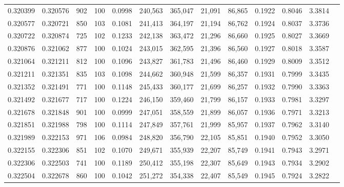 \begin{tabular}{rrrrrrrrrrrrr}
0.320399 & 0.320576 &   902 & 100 &                                     0.0998 & 240,563 & 365,047 &  21,091 &  86,865 & 0.1922 & 0.8046 & 3.3814 \\
0.320577 & 0.320721 &   850 & 103 &                                     0.1081 & 241,413 & 364,197 &  21,194 &  86,762 & 0.1924 & 0.8037 & 3.3736 \\
0.320722 & 0.320874 &   725 & 102 &                                     0.1233 & 242,138 & 363,472 &  21,296 &  86,660 & 0.1925 & 0.8027 & 3.3669 \\
0.320876 & 0.321062 &   877 & 100 &                                     0.1024 & 243,015 & 362,595 &  21,396 &  86,560 & 0.1927 & 0.8018 & 3.3587 \\
0.321064 & 0.321211 &   812 & 100 &                                     0.1096 & 243,827 & 361,783 &  21,496 &  86,460 & 0.1929 & 0.8009 & 3.3512 \\
0.321211 & 0.321351 &   835 & 103 &                                     0.1098 & 244,662 & 360,948 &  21,599 &  86,357 & 0.1931 & 0.7999 & 3.3435 \\
0.321352 & 0.321491 &   771 & 100 &                                     0.1148 & 245,433 & 360,177 &  21,699 &  86,257 & 0.1932 & 0.7990 & 3.3363 \\
0.321492 & 0.321677 &   717 & 100 &                                     0.1224 & 246,150 & 359,460 &  21,799 &  86,157 & 0.1933 & 0.7981 & 3.3297 \\
0.321678 & 0.321848 &   901 & 100 &                                     0.0999 & 247,051 & 358,559 &  21,899 &  86,057 & 0.1936 & 0.7971 & 3.3213 \\
0.321851 & 0.321988 &   798 & 100 &                                     0.1114 & 247,849 & 357,761 &  21,999 &  85,957 & 0.1937 & 0.7962 & 3.3140 \\
0.321989 & 0.322153 &   971 & 106 &                                     0.0984 & 248,820 & 356,790 &  22,105 &  85,851 & 0.1940 & 0.7952 & 3.3050 \\
0.322155 & 0.322306 &   851 & 102 &                                     0.1070 & 249,671 & 355,939 &  22,207 &  85,749 & 0.1941 & 0.7943 & 3.2971 \\
0.322306 & 0.322503 &   741 & 100 &                                     0.1189 & 250,412 & 355,198 &  22,307 &  85,649 & 0.1943 & 0.7934 & 3.2902 \\
0.322504 & 0.322678 &   860 & 100 &                                     0.1042 & 251,272 & 354,338 &  22,407 &  85,549 & 0.1945 & 0.7924 & 3.2822 \\

\end{tabular}
